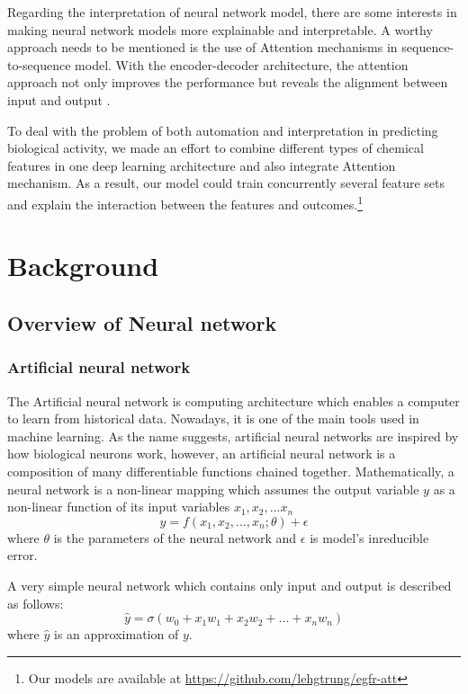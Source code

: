\documentclass[conference]{IEEEtran}
\begin{document}
Regarding the interpretation of neural network model, there are some interests in making neural network models more explainable and interpretable. 
A worthy approach needs to be mentioned is the use of Attention mechanisms in sequence-to-sequence model. With the encoder-decoder architecture, the attention approach not only improves the performance but reveals the alignment between input and output \cite{Bahdanau2014}.


To deal with the problem of both automation and interpretation in predicting biological activity, we made an effort to combine different types of chemical features in one deep learning architecture and also integrate Attention mechanism. As a result, our model could train concurrently several feature sets and explain the interaction between the features and outcomes.\footnote{Our models are available at \href{https://github.com/lehgtrung/egfr-att}{https://github.com/lehgtrung/egfr-att}}
 
\section{Background}
\subsection{Overview of Neural network}
\subsubsection{Artificial neural network}
The Artificial neural network is computing architecture which enables a computer to learn from historical data. Nowadays, it is one of the main tools used in machine learning. As the name suggests, artificial neural networks are inspired by how biological neurons work, however,  an artificial neural network is a composition of many differentiable functions chained together. Mathematically, a neural network is a non-linear mapping which assumes the output variable $y$ as a non-linear function of its input variables $x_1,x_2,...x_n$ 
\begin{equation}
    \label{nn1}
    y = f \left(x_1,x_2,...,x_n;\theta \right) + \epsilon
\end{equation}
where $\theta$ is the parameters of the neural network and $\epsilon$ is model's inreducible error.

A very simple neural network which contains only input and output is described as follows:
\begin{equation}
    \label{nn2}
    \hat{y} = \sigma \left( w_0 + x_1 w_1 + x_2 w_2 + ... + x_n w_n \right)
\end{equation}
where $\hat{y}$ is an approximation of $y$. 
\end{document}
